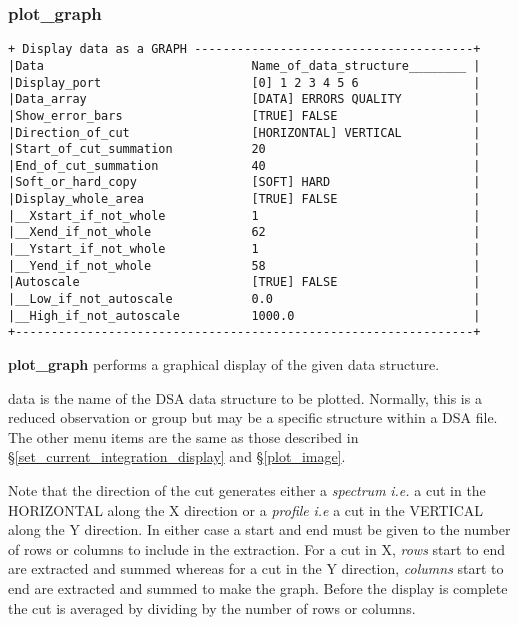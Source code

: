 {\subsubsection{plot\_graph}
\label{plot_graph}
\begin{verbatim}
+ Display data as a GRAPH ---------------------------------------+
|Data                             Name_of_data_structure________ |
|Display_port                     [0] 1 2 3 4 5 6                |
|Data_array                       [DATA] ERRORS QUALITY          |
|Show_error_bars                  [TRUE] FALSE                   |
|Direction_of_cut                 [HORIZONTAL] VERTICAL          |
|Start_of_cut_summation           20                             |
|End_of_cut_summation             40                             |
|Soft_or_hard_copy                [SOFT] HARD                    |
|Display_whole_area               [TRUE] FALSE                   |
|__Xstart_if_not_whole            1                              |
|__Xend_if_not_whole              62                             |
|__Ystart_if_not_whole            1                              |
|__Yend_if_not_whole              58                             |
|Autoscale                        [TRUE] FALSE                   |
|__Low_if_not_autoscale           0.0                            |
|__High_if_not_autoscale          1000.0                         |
+----------------------------------------------------------------+
\end{verbatim}

{\bf plot\_graph} performs a graphical display of the given data structure.

{\sf data} is the name of the DSA data structure to be plotted. Normally,
this is a reduced observation or group but may be a specific structure
within a DSA file. The other menu items are the same as those described
in \S \ref{set_current_integration_display} and \S \ref{plot_image}.

Note that the direction of the cut generates either a {\em spectrum} 
{\em i.e.} a cut in the {\sf HORIZONTAL} along the X direction or a
{\em profile} {\em i.e } a cut in the {\sf VERTICAL} along the Y direction. 
In either case a start and end must be given to the number of rows or columns 
to include in the extraction. For a cut in X, {\em rows} {\sf start} to 
{\sf end} are extracted and summed whereas for a cut in the Y direction, 
{\em columns} {\sf start} to {\sf end} are extracted and summed to make the 
graph. Before the display is complete the cut is averaged by dividing by the
number of rows or columns. 

}
